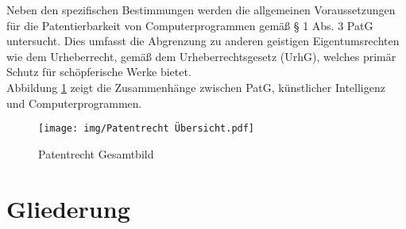 Neben den spezifischen Bestimmungen werden die allgemeinen Voraussetzungen 
für die Patentierbarkeit von Computerprogrammen gemäß § 1 Abs. 3 PatG untersucht. 
Dies umfasst die Abgrenzung 
zu anderen geistigen Eigentumsrechten wie dem Urheberrecht, 
gemäß dem Urheberrechtsgesetz (UrhG), 
welches primär Schutz für schöpferische Werke bietet.
\\

Abbildung \ref{fig:patentrecht} zeigt die Zusammenhänge zwischen PatG, 
künstlicher Intelligenz und Computerprogrammen.
\\
\begin{figure}[htb]
  \centering
  \texttt{[image: img/Patentrecht Übersicht.pdf]}\\
  \caption{Patentrecht Gesamtbild}\label{fig:patentrecht}
\end{figure}

\section{Gliederung\label{sec:outline}}


